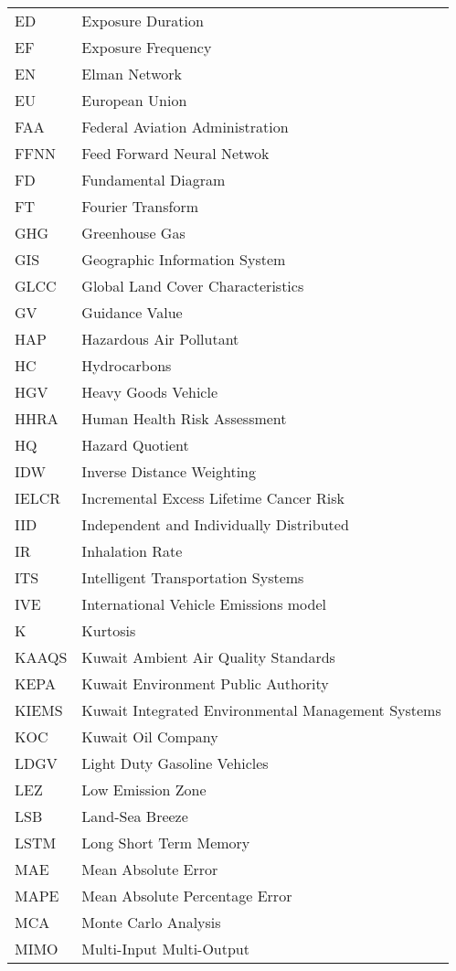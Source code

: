 \begin{longtable}{ll}
ED & Exposure Duration \\
EF & Exposure Frequency \\
EN & Elman Network \\
EU & European Union \\
FAA & Federal Aviation Administration \\
FFNN & Feed Forward Neural Netwok \\
FD & Fundamental Diagram \\
FT & Fourier Transform \\
GHG & Greenhouse Gas \\
GIS & Geographic Information System \\
GLCC & Global Land Cover Characteristics \\
GV & Guidance Value \\
HAP & Hazardous Air Pollutant \\
HC & Hydrocarbons \\
HGV & Heavy Goods Vehicle \\
HHRA & Human Health Risk Assessment \\
HQ & Hazard Quotient \\
IDW & Inverse Distance Weighting \\
IELCR & Incremental Excess Lifetime Cancer Risk \\
IID & Independent and Individually Distributed \\
IR & Inhalation Rate \\
ITS & Intelligent Transportation Systems \\
IVE & International Vehicle Emissions model\\
K & Kurtosis \\
KAAQS & Kuwait Ambient Air Quality Standards \\
KEPA & Kuwait Environment Public Authority \\
KIEMS & Kuwait Integrated Environmental Management Systems \\
KOC & Kuwait Oil Company \\
LDGV & Light Duty Gasoline Vehicles \\
LEZ & Low Emission Zone \\
LSB & Land-Sea Breeze \\
LSTM & Long Short Term Memory \\
MAE & Mean Absolute Error \\
MAPE & Mean Absolute Percentage Error \\
MCA & Monte Carlo Analysis \\
MIMO & Multi-Input Multi-Output \\

\end{longtable}
